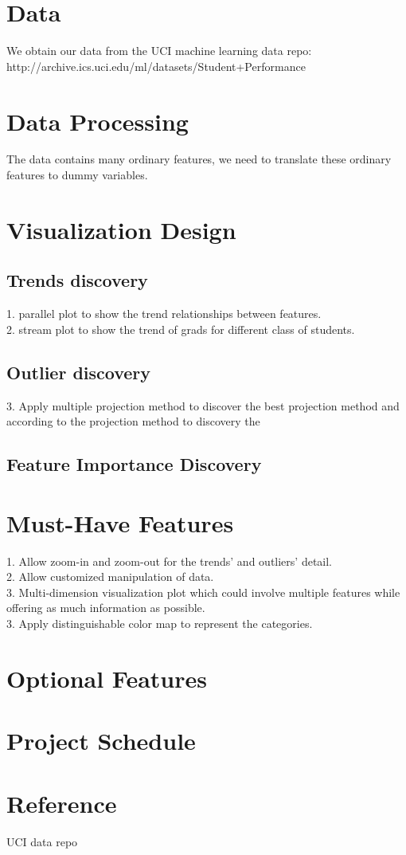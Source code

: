 \documentclass{article}
\begin{document}
\section{Data}
We obtain our data from the UCI machine learning data repo: \\
http://archive.ics.uci.edu/ml/datasets/Student+Performance
\section{Data Processing}
The data contains many ordinary features, we need to translate these ordinary features to dummy variables.
\section{Visualization Design}
\subsection{Trends discovery}
1. parallel plot to show the trend relationships between features. \\
2. stream plot to show the trend of grads for different class of students.
\subsection{Outlier discovery}
3. Apply multiple projection method to discover the best projection method and according to the projection method to discovery the 
\subsection{Feature Importance Discovery}
\section{Must-Have Features}
1. Allow zoom-in and zoom-out for the trends' and outliers' detail. \\
2. Allow customized manipulation of data. \\ 
3. Multi-dimension visualization plot which could involve multiple features while offering as much information as possible. \\
3. Apply distinguishable color map to represent the categories. \\
\section{Optional Features}
\section{Project Schedule}
\section{Reference}
UCI data repo
\end{document}
